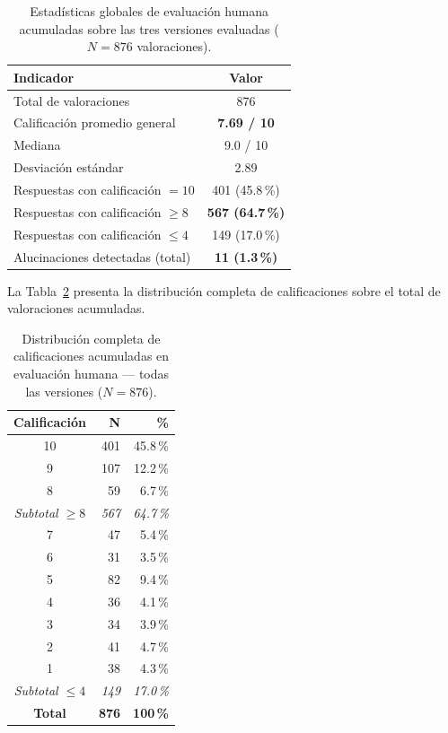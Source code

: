 \begin{table}[H]
\centering
\begin{tabular}{|l|c|}
\hline
\textbf{Indicador} & \textbf{Valor} \\
\hline
Total de valoraciones                    & 876 \\
Calificación promedio general            & \textbf{7.69 / 10} \\
Mediana                                  & 9.0 / 10 \\
Desviación estándar                      & 2.89 \\
Respuestas con calificación $= 10$       & 401 (45.8\,\%) \\
Respuestas con calificación $\geq 8$     & \textbf{567 (64.7\,\%)} \\
Respuestas con calificación $\leq 4$     & 149 (17.0\,\%) \\
Alucinaciones detectadas (total)         & \textbf{11 (1.3\,\%)} \\
\hline
\end{tabular}
\caption{Estadísticas globales de evaluación humana acumuladas sobre las tres versiones evaluadas ($N = 876$ valoraciones).}
\label{tab:eval-global}
\end{table}

La Tabla~\ref{tab:distribucion-global} presenta la distribución completa de calificaciones sobre el total de valoraciones acumuladas.

\begin{table}[H]
\centering
\begin{tabular}{|c|r|r|}
\hline
\textbf{Calificación} & \textbf{N} & \textbf{\%} \\
\hline
10 & 401 & 45.8\,\% \\
9  & 107 & 12.2\,\% \\
8  &  59 &  6.7\,\% \\
\hline
\textit{Subtotal $\geq 8$} & \textit{567} & \textit{64.7\,\%} \\
\hline
7  &  47 &  5.4\,\% \\
6  &  31 &  3.5\,\% \\
5  &  82 &  9.4\,\% \\
\hline
4  &  36 &  4.1\,\% \\
3  &  34 &  3.9\,\% \\
2  &  41 &  4.7\,\% \\
1  &  38 &  4.3\,\% \\
\hline
\textit{Subtotal $\leq 4$} & \textit{149} & \textit{17.0\,\%} \\
\hline
\textbf{Total} & \textbf{876} & \textbf{100\,\%} \\
\hline
\end{tabular}
\caption{Distribución completa de calificaciones acumuladas en evaluación humana — todas las versiones ($N = 876$).}
\label{tab:distribucion-global}
\end{table}

